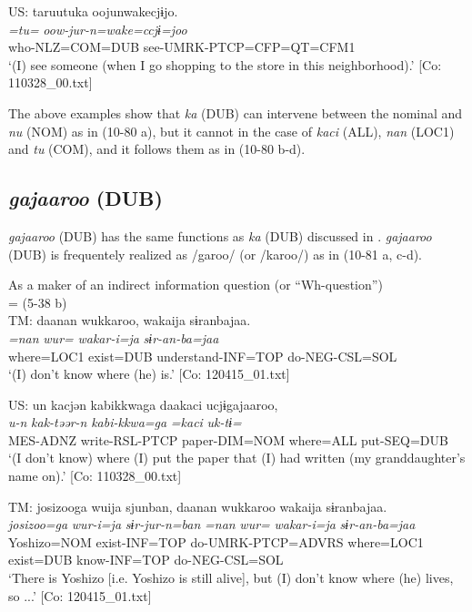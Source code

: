   \ex   US: \glll taruutuka  oojunwakecjɨjo.\\
      \textit{=tu=}  \textit{oow-jur-n=wake=ccjɨ=joo}\\
      who-NLZ=COM=DUB  see-UMRK-PTCP=CFP=QT=CFM1\\
      \glt       ‘(I) see someone (when I go shopping to the store in this neighborhood).’ [Co: 110328\_00.txt]
    \z
\z

The above examples show that \textit{ka} (DUB) can intervene between the nominal and \textit{nu} (NOM) as in (10-80 a), but it cannot in the case of \textit{kaci} (ALL), \textit{nan} (LOC1) and \textit{tu} (COM), and it follows them as in (10-80 b-d).

\subsection{\textit{gajaaroo} (DUB)}\label{sec:10.4.3}

\textit{gajaaroo} (DUB) has the same functions as \textit{ka} (DUB) discussed in . \textit{gajaaroo} (DUB) is frequentely realized as /garoo/ (or /karoo/) as in (10-81 a, c-d).

\ea\label{ex:10.81}   As a maker of an indirect information question (or “Wh-question”)\\
  \ea{} = (5-38 b)\\
    TM:
      \glll    daanan  wukkaroo,  wakaija  sɨranbajaa.\\
      \textit{=nan}  \textit{wur=}  \textit{wakar-i=ja}  \textit{sɨr-an-ba=jaa}\\
      where=LOC1  exist=DUB  understand-INF=TOP  do-NEG-CSL=SOL\\
      \glt       ‘(I) don’t know where (he) is.’ [Co: 120415\_01.txt]

  \ex  US:  \glll un  kacjən  kabikkwaga  daakaci  ucjɨgajaaroo,\\
      \textit{u-n}  \textit{kak-təər-n}  \textit{kabi-kkwa=ga}  \textit{=kaci}  \textit{uk-tɨ=}\\
      MES-ADNZ  write-RSL{}-PTCP  paper{}-DIM=NOM  where=ALL  put-SEQ=DUB\\
      \glt       ‘(I don’t know) where (I) put the paper that (I) had written (my granddaughter’s name on).’ [Co: 110328\_00.txt]

  \ex  TM:
      \glll    {\textbar}josizoo{\textbar}ga  wuija  sjunban,  daanan wukkaroo  wakaija  sɨranbajaa.\\
      \textit{josizoo=ga}  \textit{wur-i=ja}  \textit{sɨr-jur-n=ban}  \textit{=nan}  \textit{wur=}  \textit{wakar-i=ja}  \textit{sɨr-an-ba=jaa}\\
      Yoshizo=NOM  exist-INF=TOP  do-UMRK-PTCP=ADVRS  where=LOC1  exist=DUB  know-INF=TOP  do-NEG-CSL=SOL\\
      \glt       ‘There is Yoshizo [i.e. Yoshizo is still alive], but (I) don’t know where (he) lives, so ...’ [Co: 120415\_01.txt]

